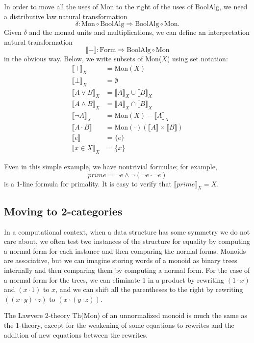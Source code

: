 \documentclass{article}
\newcommand{\interp}[1]{\llbracket #1 \rrbracket}
\newcommand{\maps}{\colon}
\newcommand{\Mon}{\mathrm{Mon}}
\newcommand{\BoolAlg}{\mathrm{BoolAlg}}
\newcommand{\Form}{\mathrm{Form}}
\begin{document}
In order to move all the uses of Mon to the right of the uses of BoolAlg, we need a distributive law natural transformation
\[ \delta\maps \Mon \circ \BoolAlg \Rightarrow \BoolAlg \circ \Mon. \]
Given $\delta$ and the monad units and multiplications, we can define an interpretation natural transformation
\[ \interp{-}\maps \Form\Rightarrow \BoolAlg \circ \Mon \]
in the obvious way.  Below, we write subsets of Mon($X$) using set notation:
\begin{align*}
  \interp{\top}_X &= \Mon(X)\\
  \interp{\bot}_X &= \emptyset\\
  \interp{{A}\lor{B}}_X &= \interp{A}_X \cup \interp{B}_X\\
  \interp{{A}\land{B}}_X &= \interp{A}_X \cap \interp{B}_X\\
  \interp{\neg A}_X &= \Mon(X) - \interp{A}_X\\
  \interp{{A} \cdot {B}} &= \Mon(\cdot)(\interp{A} \times \interp{B})\\
  \interp{e} &= \{e\}\\
  \interp{x \in X}_X &= \{x\}
\end{align*}

Even in this simple example, we have nontrivial formulae; for example,
\[ prime = \neg e \land \neg(\neg e \cdot \neg e) \]
is a 1-line formula for primality.  It is easy to verify that $\interp{prime}_X = X.$

\subsection{Moving to 2-categories}

In a computational context, when a data structure has some symmetry we do not care about, we often test two instances of the structure for equality by computing a normal form for each instance and then comparing the normal forms.  Monoids are associative, but we can imagine storing words of a monoid as binary trees internally and then comparing them by computing a normal form.  For the case of a normal form for the trees, we can eliminate 1 in a product by rewriting $(1 \cdot x)$ and $(x \cdot 1)$ to $x$, and we can shift all the parentheses to the right by rewriting $((x \cdot y) \cdot z)$ to $(x \cdot (y \cdot z)).$

The Lawvere 2-theory Th(Mon) of an unnormalized monoid is much the same as the 1-theory, except for the weakening of some equations to rewrites and the addition of new equations between the rewrites.
\end{document}

